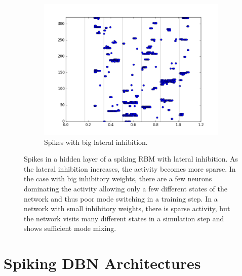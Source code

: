 \begin{figure}[h!]
	\begin{subfigure}[t]{.55\textwidth}
  		\centering
  		\includegraphics[width=.9\linewidth]{imgs/app/inhib_big.png}
  		\caption{Spikes with big lateral inhibition.}
  		\label{fig:sub2}
	\end{subfigure}
	\caption[Spikes in a hidden layer of a spiking RBM with different kinds of lateral inhibition.]{Spikes in a hidden layer of a spiking RBM with lateral inhibition. As the lateral inhibition increases, the activity becomes more sparse. In the case with big inhibitory weights, there are a few neurons dominating the activity allowing only a few different states of the network and thus poor mode switching in a training step. In a network with small inhibitory weights, there is sparse activity, but the network visits many different states in a simulation step and shows sufficient mode mixing. }
	\label{fig:dbnmixing}
\end{figure}
   
\section{Spiking DBN Architectures}   
   

